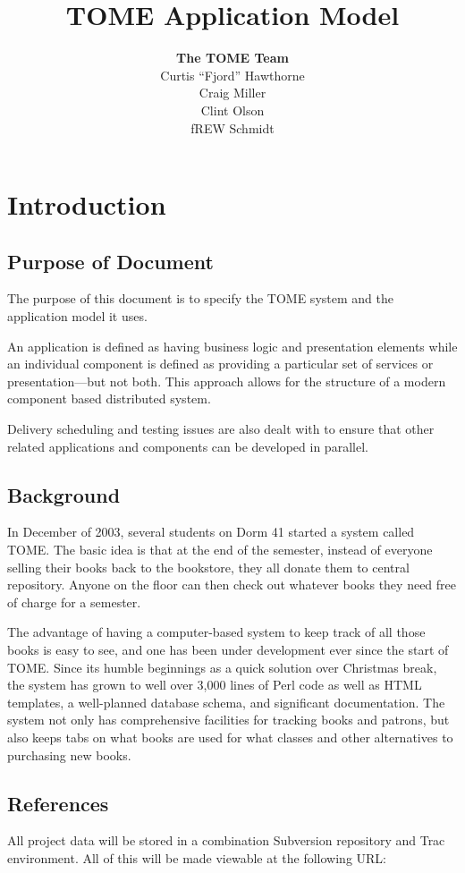 \documentclass[12pt,titlepage]{article}
\author{\textbf{The TOME Team}\\
Curtis ``Fjord'' Hawthorne \\
Craig Miller\\
Clint Olson\\
fREW Schmidt
}
\title{\textbf{TOME Application Model}}
\begin{document}
\maketitle
\tableofcontents
\listoffigures
\newpage
\section{Introduction}
\subsection{Purpose of Document}
The purpose of this document is to specify the TOME system and the application model it uses.

An application is defined as having business logic and presentation elements while an individual component is defined as providing a particular set of services or presentation—but not both. This approach allows for the structure of a modern component based distributed system.

Delivery scheduling and testing issues are also dealt with to ensure that other related applications and components can be developed in parallel.
\subsection{Background}
In December of 2003, several students on Dorm 41 started a system called TOME.  The basic idea is that at the end of the semester, instead of everyone selling their books back to the bookstore, they all donate them to central repository.  Anyone on the floor can then check out whatever books they need free of charge for a semester.

The advantage of having a computer-based system to keep track of all those books is easy to see, and one has been under development ever since the start of TOME.  Since its humble beginnings as a quick solution over Christmas break, the system has grown to well over 3,000 lines of Perl code as well as HTML templates, a well-planned database schema, and significant documentation.  The system not only has comprehensive facilities for tracking books and patrons, but also keeps tabs on what books are used for what classes and other alternatives to purchasing new books.
\subsection{References}
\label{references}
All project data will be stored in a combination Subversion repository and Trac environment.  All of this will be made viewable at the following URL:
\end{document}
